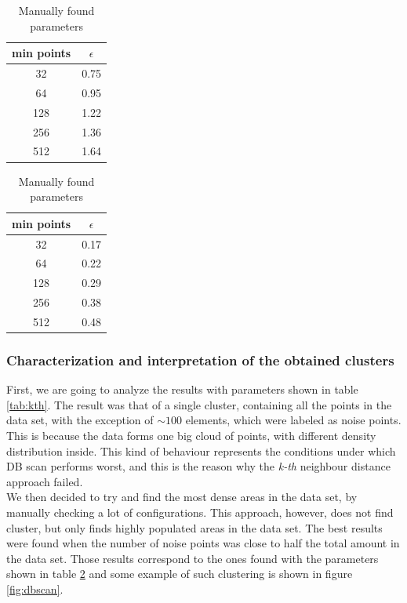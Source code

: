 \documentclass{article}
\begin{document}
\begin{table}
\parbox{.45\linewidth}{
\centering
\begin{tabular}{c|c}
\hline
min points & $\epsilon$\\
\hline
\rowcolor{Gray}
32 & 0.75 \\
64 & 0.95 \\
\rowcolor{Gray}
128 & 1.22 \\
256 & 1.36 \\
\rowcolor{Gray}
512 & 1.64 \\
\end{tabular}
\caption{K-th nearest neighbours parameters}
\label{tab:kth}
}
\hfill
\parbox{.45\linewidth}{
\centering
\begin{tabular}{c|c}
\hline
min points & $\epsilon$\\
\hline
\rowcolor{Gray}
32 & 0.17 \\
64 & 0.22 \\
\rowcolor{Gray}
128 & 0.29 \\
256 & 0.38 \\
\rowcolor{Gray}
512 & 0.48 \\
\end{tabular}
\caption{Manually found parameters}
\label{tab:dbscan}
}
\end{table}

\subsubsection{Characterization and interpretation of the obtained clusters}
\label{sec:dbscaneval}
First, we are going to analyze the results with parameters shown in table \ref{tab:kth}. The result was that of a single cluster, containing all the points in the data set, with the exception of $\sim 100$ elements, which were labeled as noise points. This is because the data forms one big cloud of points, with different density distribution inside. This kind of behaviour represents the conditions under which DB scan performs worst, and this is the reason why the \emph{k-th} neighbour distance approach failed. \\
We then decided to try and find the most dense areas in the data set, by manually checking a lot of configurations. This approach, however, does not find cluster, but only finds highly populated areas in the data set. 
The best results were found when the number of noise points was close to half the total amount in the data set. Those results correspond to the ones found with the parameters shown in table \ref{tab:dbscan} and some example of such clustering is shown in figure \ref{fig:dbscan}.
\end{document}

